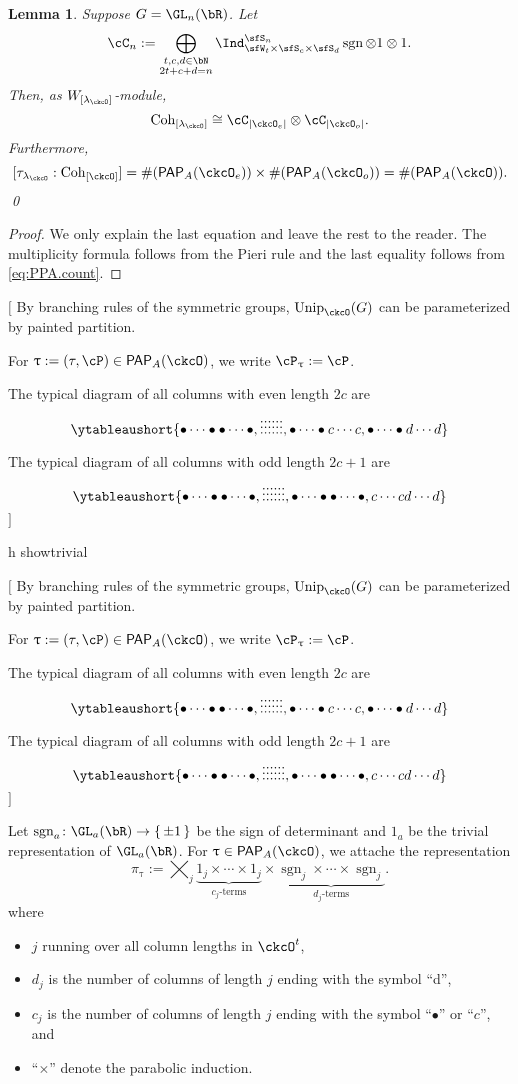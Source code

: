 \documentclass[12pt,a4paper]{amsart}
\let\ytb=\ytableaushort
\newcommand{\trivial}[2][]{\if\relax\detokenize{#1}\relax
  {%
      \color{orange} \vspace{0em} $[$  #2 $]$
      \color{black}
  }
  \else
\ifx#1h
\ifcsname showtrivial\endcsname
{%
    \color{orange} \vspace{0em}  $[$ #2 $]$
    \color{black}
}
\fi
\else {\red Wrong argument!} \fi
\fi
}
\def\abs#1{\left|{#1}\right|}
\newcommand{\sgn}{\operatorname{sgn}}
\numberwithin{equation}{section}
\newtheorem{lem}[thm]{Lemma}
\theoremstyle{remark}
\def\Unip{\mathrm{Unip}}
\def\lamck{\lambda_\ckcO}
\def\Wint#1{W_{[#1]}}
\def\Cint#1{\Coh_{[#1]}}
\def\PP{\mathsf{PAP}}
\def\Coh{\mathrm{Coh}}
\begin{document}
\begin{lem} \label{lem:GL.count}
  Suppose $G = \GL_{n}(\bR)$. Let
  \[
    \cC_n := \bigoplus_{\substack{t,c,d\in \bN \\2t+c+d=n}} \Ind_{\sfW_t\times \sfS_c\times \sfS_d}^{\sfS_{n}} \sgn \otimes 1\otimes 1.
  \]
  Then, as $W_{[\lamck]}$-module,
  \[
    \Cint{\lamck} \cong \cC_{\abs{\ckcO_{e}}}\otimes \cC_{\abs{\ckcO_{o}}}.
  \]
  Furthermore,
  \begin{equation}\label{eq:A.count}
    [\tau_{\lamck}: \Cint{\ckcO}] = \# (\PP_{A}(\ckcO_{e}))\times
    \# (\PP_{A}(\ckcO_{o})) = \# (\PP_{A}(\ckcO)).
  \end{equation}
  \qed
\end{lem}
\begin{proof}
  We only explain the last equation and leave the rest to the reader.
  The multiplicity formula follows from the Pieri rule and the last equality
  follows from \eqref{eq:PPA.count}.
\end{proof}

\trivial[]{
By branching rules of the symmetric groups, $\Unip_{\ckcO}(G)$ can be
parameterized by painted partition.

For $\uptau:=(\tau,\cP)\in \PP_{A}(\ckcO)$, we write $\cP_{\uptau}:= \cP$.

  The typical diagram of all columns with even length $2c$ are
  \[
    \ytb{\bullet\cdots\bullet\bullet\cdots\bullet,\vdots\vdots\vdots\vdots\vdots\vdots, \bullet\cdots\bullet c\cdots c, \bullet\cdots\bullet d\cdots d }
  \]

  The typical diagram of all columns with odd length $2c+1$ are
  \[
    \ytb{\bullet\cdots\bullet\bullet\cdots\bullet,\vdots\vdots\vdots\vdots\vdots\vdots, \bullet\cdots\bullet \bullet\cdots\bullet , c\cdots c d\cdots d }
  \]
}

Let $\sgn_a\colon \GL_a(\bR)\rightarrow \set{\pm 1}$ be the sign of determinant
and $1_a$ be the trivial representation of $\GL_a(\bR)$.
For
$\uptau\in \PP_{A}(\ckcO)$, we attache the representation
\begin{equation}\label{eq:u.GLR}
  \pi_\uptau :=
  \bigtimes_{j} \underbrace{1_j \times \cdots \times 1_j}_{c_j\text{-terms}}\times
  \underbrace{\sgn_j \times \cdots \times {\sgn_j} }_{d_j\text{-terms}}.
\end{equation}
where
\begin{itemize}
  \item $j$ running over all column lengths in $\ckcO^t$,
  \item $d_j$ is the number of columns of length $j$ ending with the symbol
        ``d'',
  \item $c_j$ is the number of columns of length $j$ ending with the symbol
        ``$\bullet$'' or ``$c$'', and
  \item ``$\times$'' denote the parabolic induction.
\end{itemize}
\end{document}
